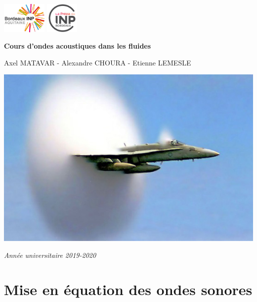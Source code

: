 \documentclass[a4paper, 12pt]{article}
\begin{document}
\begin{titlepage}
{\includegraphics[height=1.5cm]{bx-inp.png}}
{\includegraphics[height=1.5cm]{cpp-inp.png}}
\begin{center}
 \Huge{\textbf{Cours d'ondes acoustiques dans les fluides}}
\end{center}
\begin{center}
 \normalsize{Axel MATAVAR - Alexandre CHOURA - Etienne LEMESLE}
\end{center}
\begin{center}
 {\includegraphics[scale=0.65]{frst-pg.png}}
\end{center}
\begin{center}
 \Large{\textit{Ann\'ee universitaire 2019-2020}}
\end{center}
\end{titlepage}

\tableofcontents
\newpage

\section{Mise en équation des ondes sonores}
\end{document}
